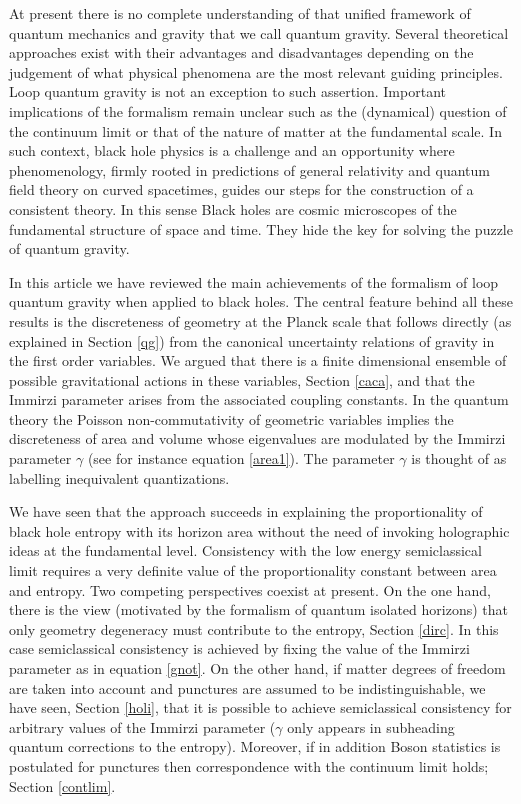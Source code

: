 \documentclass[aps, nofootinbib,superscriptaddress,12pt]{revtex4-2}
\begin{document}
At present there is no complete understanding of that unified framework of quantum mechanics and gravity that we  call quantum gravity. Several theoretical approaches exist with their advantages and disadvantages depending on the judgement of what physical phenomena are the most relevant guiding principles.   Loop quantum gravity is not an exception to such assertion. Important implications of the formalism remain unclear such as the (dynamical) question of the continuum limit or that of the nature of matter at the fundamental scale.
In such context, black hole physics is a challenge and an opportunity  where phenomenology, firmly rooted in predictions of general relativity and quantum field theory on curved spacetimes, guides our steps for the construction of a consistent theory. In this sense Black holes are cosmic  microscopes of the fundamental structure of space and time. They hide the key for solving the puzzle of quantum gravity.

In this article we have reviewed the main achievements of the formalism of loop quantum gravity when applied to black holes. The central feature  behind all these results is the discreteness of geometry at the Planck scale that follows directly (as explained in Section \ref{qg}) from the canonical uncertainty relations of gravity in the first order variables. We argued that there is a finite dimensional ensemble of possible gravitational actions in these variables, Section \ref{caca}, and that the Immirzi parameter arises from the associated coupling constants.  In the quantum theory the Poisson non-commutativity of geometric variables implies the discreteness of area and volume whose eigenvalues  
are modulated by the Immirzi parameter $\gamma$ (see for instance equation \eqref{area1}). The parameter $\gamma$ is thought of as labelling inequivalent quantizations.   


We have seen that the approach succeeds in explaining the proportionality of black hole entropy with its horizon area without the need of invoking  holographic ideas at the fundamental level. Consistency with the low energy semiclassical limit requires a very definite value of the proportionality constant between area and entropy. Two competing perspectives coexist at present. On the one hand, there is the view (motivated by the formalism of quantum isolated horizons) that only geometry degeneracy must contribute to the entropy, Section \ref{dirc}. In this case semiclassical consistency is achieved by fixing the value of the Immirzi parameter as in equation \eqref{gnot}. On the other hand,  if matter degrees of freedom are taken into account and punctures are assumed to be indistinguishable, we have seen, Section \ref{holi}, that it is possible to achieve semiclassical consistency for arbitrary values of the Immirzi parameter ($\gamma$ only appears in subheading quantum corrections to the entropy). Moreover, if in addition Boson statistics is postulated for punctures then correspondence with the continuum limit holds; Section \ref{contlim}.   
\end{document}
